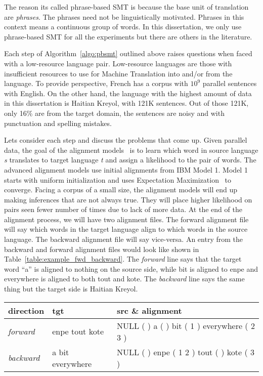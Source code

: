 The reason its called phrase-based SMT is because the base unit of translation are \emph{phrases}. The phrases need not be linguistically motivated. Phrases in this context means a continuous group of words. In this dissertation, we only use phrase-based SMT for all the experiments but there are others in the literature.~\cite{Chiang:07,Michel:04}

Each step of Algorithm~\ref{algo:pbsmt} outlined above raises questions when faced with a low-resource language pair. Low-resource languages are those with insufficient resources to use for Machine Translation into and/or from the language. To provide perspective, French has a corpus with $10^9$ parallel sentences with English. On the other hand, the language with the highest amount of data in this dissertation is Haitian Kreyol, with 121K sentences. Out of those 121K, only 16\% are from the target domain, the sentences are noisy and with punctuation and spelling mistakes.


Lets consider each step and discuss the problems that come up. Given parallel data, the goal of the alignment models~\cite{Brown:1993,Vogel:1996} is to learn which word in source language \emph{s} translates to target language \emph{t} and assign a likelihood to the pair of words. The advanced alignment models use initial alignments from IBM Model 1. Model 1 starts with uniform initialization and uses Expectation Maximization~\cite{Dempster:77} to converge. Facing a corpus of a small size, the alignment models will end up making inferences that are not always true. They will place higher likelihood on pairs seen fewer number of times due to lack of more data. At the end of the alignment process, we will have two alignment files. The forward alignment file will say which words in the target language align to which words in the source language. The backward alignment file will say vice-versa. An entry from the backward and forward alignment files would look like shown in Table~\ref{table:example_fwd_backward}. The \emph{forward} line says that the target word ``a'' is aligned to nothing on the source side, while bit is aligned to enpe and everywhere is aligned to both tout and kote. The \emph{backward} line says the same thing but the target side is Haitian Kreyol. 

\begin{table*}
\small
\small
\begin{tabular}{lp{}p{}}
\toprule
direction & tgt & src \& alignment \\
\toprule
\emph{forward} & enpe tout kote & NULL ({ }) a ({ }) bit ({ 1 }) everywhere ({ 2 3 })  \\
\emph{backward} & a bit everywhere & NULL ({ }) enpe ({ 1 2 }) tout ({ }) kote ({ 3 }) \\
\bottomrule
\end{tabular}
\caption{Example of a forward and backward alignment}
\label{table:example_fwd_backward}
\end{table*}


